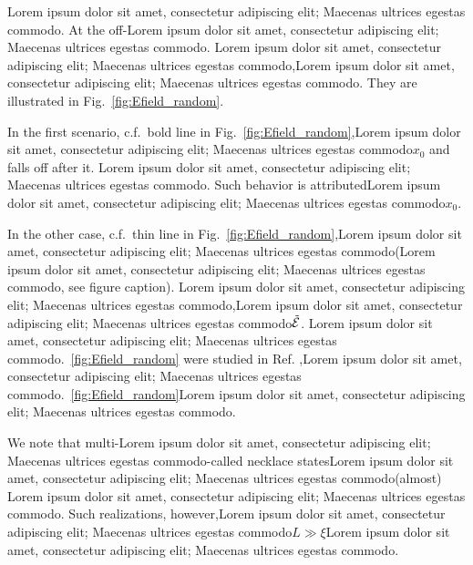 Lorem ipsum dolor sit amet, consectetur adipiscing elit; Maecenas ultrices egestas commodo. At the off-Lorem ipsum dolor sit amet, consectetur adipiscing elit; Maecenas ultrices egestas commodo. Lorem ipsum dolor sit amet, consectetur adipiscing elit; Maecenas ultrices egestas commodo,Lorem ipsum dolor sit amet, consectetur adipiscing elit; Maecenas ultrices egestas commodo. They are illustrated in Fig.~\ref{fig:Efield_random}.

In the first scenario, c.f.~bold line in Fig.~\ref{fig:Efield_random},Lorem ipsum dolor sit amet, consectetur adipiscing elit; Maecenas ultrices egestas commodo$x_0$ and falls off after it. Lorem ipsum dolor sit amet, consectetur adipiscing elit; Maecenas ultrices egestas commodo. Such behavior is attributed\cite{1983_Azbel_zeroTemp}Lorem ipsum dolor sit amet, consectetur adipiscing elit; Maecenas ultrices egestas commodo$x_0$. 

In the other case, c.f.~thin line in Fig.~\ref{fig:Efield_random},Lorem ipsum dolor sit amet, consectetur adipiscing elit; Maecenas ultrices egestas commodo(Lorem ipsum dolor sit amet, consectetur adipiscing elit; Maecenas ultrices egestas commodo, see figure caption). Lorem ipsum dolor sit amet, consectetur adipiscing elit; Maecenas ultrices egestas commodo,Lorem ipsum dolor sit amet, consectetur adipiscing elit; Maecenas ultrices egestas commodo$\tilde{\cal E}$. Lorem ipsum dolor sit amet, consectetur adipiscing elit; Maecenas ultrices egestas commodo.~\ref{fig:Efield_random} were studied in Ref. \cite{1983_Azbel_zeroTemp},Lorem ipsum dolor sit amet, consectetur adipiscing elit; Maecenas ultrices egestas commodo.~\ref{fig:Efield_random}Lorem ipsum dolor sit amet, consectetur adipiscing elit; Maecenas ultrices egestas commodo.

We note that multi-Lorem ipsum dolor sit amet, consectetur adipiscing elit; Maecenas ultrices egestas commodo-called necklace states\cite{1987_Pendry,2005_Wiersma,2006_Genack_1d}Lorem ipsum dolor sit amet, consectetur adipiscing elit; Maecenas ultrices egestas commodo(almost) Lorem ipsum dolor sit amet, consectetur adipiscing elit; Maecenas ultrices egestas commodo. Such realizations, however,Lorem ipsum dolor sit amet, consectetur adipiscing elit; Maecenas ultrices egestas commodo$L\gg\xi$Lorem ipsum dolor sit amet, consectetur adipiscing elit; Maecenas ultrices egestas commodo. 

